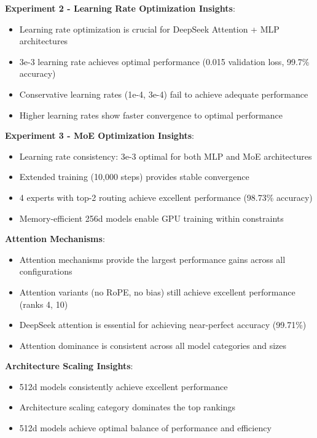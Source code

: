 \documentclass[11pt,a4paper]{article}
\begin{document}
\textbf{Experiment 2 - Learning Rate Optimization Insights}:
\begin{itemize}
    \item Learning rate optimization is crucial for DeepSeek Attention + MLP architectures
    \item 3e-3 learning rate achieves optimal performance (0.015 validation loss, 99.7\% accuracy)
    \item Conservative learning rates (1e-4, 3e-4) fail to achieve adequate performance
    \item Higher learning rates show faster convergence to optimal performance
\end{itemize}

\textbf{Experiment 3 - MoE Optimization Insights}:
\begin{itemize}
    \item Learning rate consistency: 3e-3 optimal for both MLP and MoE architectures
    \item Extended training (10,000 steps) provides stable convergence
    \item 4 experts with top-2 routing achieve excellent performance (98.73\% accuracy)
    \item Memory-efficient 256d models enable GPU training within constraints
\end{itemize}

\textbf{Attention Mechanisms}:
\begin{itemize}
    \item Attention mechanisms provide the largest performance gains across all configurations
    \item Attention variants (no RoPE, no bias) still achieve excellent performance (ranks 4, 10)
    \item DeepSeek attention is essential for achieving near-perfect accuracy (99.71\%)
    \item Attention dominance is consistent across all model categories and sizes
\end{itemize}

\textbf{Architecture Scaling Insights}:
\begin{itemize}
    \item 512d models consistently achieve excellent performance
    \item Architecture scaling category dominates the top rankings
    \item 512d models achieve optimal balance of performance and efficiency
\end{itemize}
\end{document}
